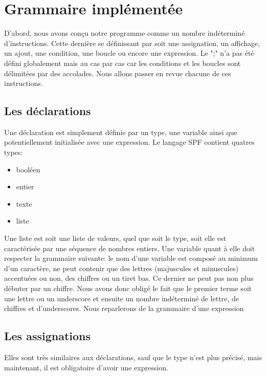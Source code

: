 \section{Grammaire implémentée}
D'abord, nous avons conçu notre programme %
comme un nombre indéterminé d'instructions.
Cette dernière se définissant par soit une assignation, un affichage, un ajout, une condition, une boucle ou encore une expression.
Le ";" n'a pas été défini globalement mais au cas par cas car les conditions et les boucles sont délimitées par des accolades.
Nous allons passer en revue chacune de ces instructions.

\subsection{Les déclarations}
Une déclaration est simplement définie par un type, une variable ainsi que potentiellement initialisée avec une expression.
Le langage SPF contient quatres types:

\begin{itemize}
\item booléen
\item entier
\item texte
\item liste
\end{itemize}

Une liste est soit une liste de valeurs, quel que soit le type, soit elle est caractérisée par une séquence de nombres entiers. %
Une variable quant à elle doit respecter la grammaire suivante:
le nom d’une variable est composé au minimum d’un caractère, ne peut contenir que des lettres (majuscules et minuscules) accentuées ou non, des chiffres ou un tiret bas. %
Ce dernier ne peut pas non plus débuter par un chiffre.
Nous avons donc obligé le fait que le premier terme soit une lettre ou un underscore et ensuite un nombre indéterminé de lettre, de chiffres et d'underscores. %
Nous reparlerons de la grammaire d'une expression %

\subsection{Les assignations}
Elles sont très similaires aux déclarations, sauf que le type n'est plus précisé, mais maintenant, il est obligatoire d'avoir une expression.

